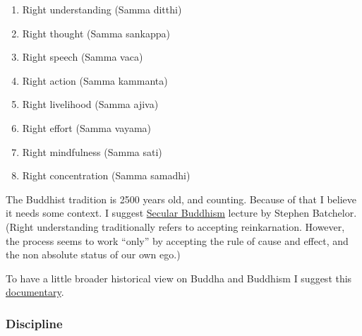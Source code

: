 \documentclass{article}
\begin{document}
\begin{enumerate}
    \item Right understanding (Samma ditthi)
    \item Right thought (Samma sankappa)
    \item Right speech (Samma vaca) 
    \item Right action (Samma kammanta)
    \item Right livelihood (Samma ajiva) 
    \item Right effort (Samma vayama)
    \item Right mindfulness (Samma sati)
    \item Right concentration (Samma samadhi)
\end{enumerate}
The Buddhist tradition is 2500 years old, and counting. Because of that I believe it needs some context. I suggest \href{https://www.youtube.com/watch?v=Hhlj_SU9SAE}{Secular Buddhism} lecture by Stephen Batchelor.
(Right understanding traditionally refers to accepting reinkarnation. However, the process seems to work ``only'' by accepting the rule of cause and effect, and the non absolute status of our own ego.)

To have a little broader historical view on Buddha and Buddhism I suggest this \href{https://www.youtube.com/watch?v=ulSlL3ubJ3c}{documentary}.

\iffalse
\begin{minipage}[t]{0.45\textwidth}

...

\end{minipage}
\hfill
\begin{minipage}[t]{0.45\textwidth}

...

\end{minipage}
\fi


\subsubsection{Discipline}
\end{document}
